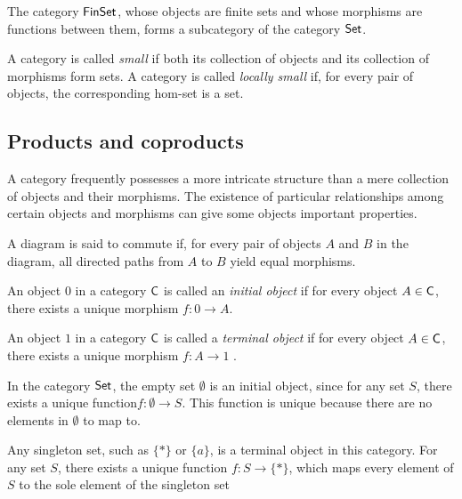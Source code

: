 \begin{example}
  The category $\mathsf{FinSet}$, whose objects are finite sets and whose morphisms are functions between them, forms a subcategory of the category $\mathsf{Set}$.
\end{example}


\begin{definition}
  A category is called \emph{small} if both its collection of objects and its collection of morphisms form sets.
A category is called \emph{locally small} if, for every pair of objects, the corresponding hom-set is a set.
\end{definition}






\subsection{Products and coproducts}

 A category frequently possesses a more intricate structure than a mere collection of objects and their morphisms. The existence of particular relationships among certain objects and morphisms can give some objects important properties.

A diagram is said to commute if, for every pair of objects $A$ and $B$ in the diagram, all directed paths from 
$A$ to $B$ yield equal morphisms.

\begin{definition}
  An object \( 0 \) in a category \( \mathsf{C} \) is called an \emph{initial object} if for every object \( A \in \mathsf{C}  \), there exists a unique morphism  $f: 0 \to A $.

\end{definition}

\begin{definition}
  An object \( 1 \) in a category \( \mathsf{C}  \) is called a \emph{terminal object} if for every object \( A \in \mathsf{C}  \), there exists a unique morphism $ f: A \to 1 $ .
\end{definition}

\begin{example}
In the category \( \mathsf{Set} \), the empty set \( \emptyset \) is an initial object, since for any set \( S \), there exists a unique function$f : \emptyset \to S.$
This function is unique because there are no elements in \( \emptyset \) to map to.

Any singleton set, such as \( \{*\} \) or \( \{a\} \), is a terminal object in this category. For any set \( S \), there exists a unique function $f : S \to \{*\}$,
which maps every element of \( S \) to the sole element of the singleton set
\end{example}


